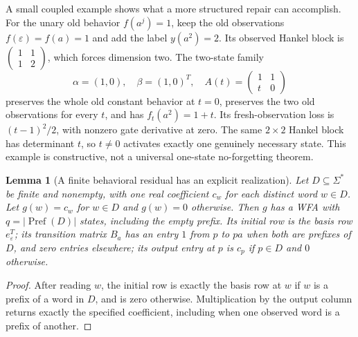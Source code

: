 \documentclass[11pt]{article}
\newtheorem{lemma}[theorem]{Lemma}
\theoremstyle{definition}
\theoremstyle{remark}
\begin{document}
A small coupled example shows what a more structured repair can accomplish.
For the unary old behavior $f(a^j)=1$, keep the old observations
$f(\varepsilon)=f(a)=1$ and add the label $y(a^2)=2$. Its observed
Hankel block is $\left(\begin{smallmatrix}1&1\\1&2\end{smallmatrix}\right)$,
which forces dimension two. The two-state family
\[
 \alpha=(1,0),\quad\beta=(1,0)^T,\quad
 A(t)=\begin{pmatrix}1&1\\t&0\end{pmatrix}
\]
preserves the whole old constant behavior at $t=0$, preserves the two old
observations for every $t$, and has $f_t(a^2)=1+t$. Its fresh-observation
loss is $(t-1)^2/2$, with nonzero gate derivative at zero. The same
$2\times2$ Hankel block has determinant $t$, so $t\ne0$ activates
exactly one genuinely necessary state. This example is constructive, not a
universal one-state no-forgetting theorem.

\begin{lemma}[A finite behavioral residual has an explicit realization]
\label{ce:trie}
Let $D\subseteq\Sigma^*$ be finite and nonempty, with one real coefficient
$c_w$ for each distinct word $w\in D$. Let
$g(w)=c_w$ for $w\in D$ and $g(w)=0$ otherwise.
Then $g$ has a WFA with $q=|\operatorname{Pref}(D)|$ states, including
the empty prefix. Its initial row is the basis row $e_\varepsilon^T$;
its transition matrix $B_a$ has an entry $1$ from $p$ to $pa$ when both
are prefixes of $D$, and zero entries elsewhere; its output entry at $p$
is $c_p$ if $p\in D$ and $0$ otherwise.
\end{lemma}
\begin{proof}
After reading $w$, the initial row is exactly the basis row at $w$ if $w$
is a prefix of a word in $D$, and is zero otherwise. Multiplication by the
output column returns exactly the specified coefficient, including when
one observed word is a prefix of another.
\end{proof}
\end{document}
